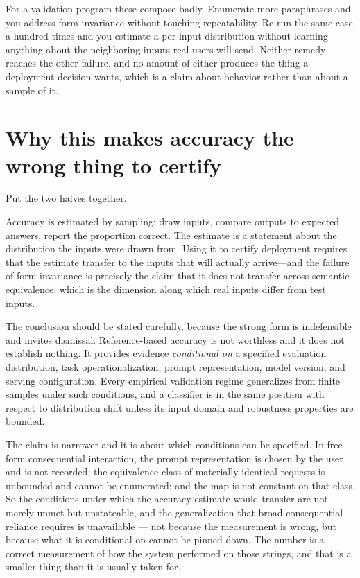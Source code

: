 For a validation program these compose badly. Enumerate more paraphrases and you
address form invariance without touching repeatability. Re-run the same case a
hundred times and you estimate a per-input distribution without learning anything
about the neighboring inputs real users will send. Neither remedy reaches the other
failure, and no amount of either produces the thing a deployment decision wants,
which is a claim about behavior rather than about a sample of it.

\section{Why this makes accuracy the wrong thing to certify}

Put the two halves together.

Accuracy is estimated by sampling: draw inputs, compare outputs to expected
answers, report the proportion correct. The estimate is a statement about the
distribution the inputs were drawn from. Using it to certify deployment requires
that the estimate transfer to the inputs that will actually arrive---and the
failure of form invariance is precisely the claim that it does not transfer across
semantic
equivalence, which is the dimension along which real inputs differ from test
inputs.

The conclusion should be stated carefully, because the strong form is indefensible and
invites dismissal. Reference-based accuracy is not worthless and it does not establish
nothing. It provides evidence \emph{conditional on} a specified evaluation
distribution, task operationalization, prompt representation, model version, and serving
configuration. Every empirical validation regime generalizes from finite samples under
such conditions, and a classifier is in the same position with respect to distribution
shift unless its input domain and robustness properties are bounded.

The claim is narrower and it is about which conditions can be specified. In free-form
consequential interaction, the prompt representation is chosen by the user and is not
recorded; the equivalence class of materially identical requests is unbounded and cannot
be enumerated; and the map is not constant on that class. So the conditions under which
the accuracy estimate would transfer are not merely unmet but unstateable, and the
generalization that broad consequential reliance requires is unavailable --- not because
the measurement is wrong, but because what it is conditional on cannot be pinned down.
The number is a correct measurement of how the system performed on those strings, and
that is a smaller thing than it is usually taken for.

